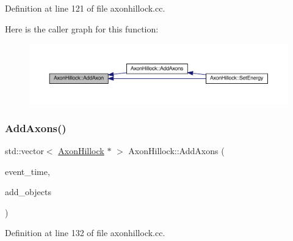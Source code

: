 Definition at line 121 of file axonhillock.\+cc.

Here is the caller graph for this function\+:\nopagebreak
\begin{figure}[H]
\begin{center}
\leavevmode
\includegraphics[width=350pt]{class_axon_hillock_a02bfbaea9ea7a160933f8500c8b41d6a_icgraph}
\end{center}
\end{figure}
\mbox{\label{class_axon_hillock_a54a82227b96757f1c0d7450df6a3df37}} 
\subsubsection{\texorpdfstring{Add\+Axons()}{AddAxons()}}
{\footnotesize\ttfamily std\+::vector$<$ \hyperlink{class_axon_hillock}{Axon\+Hillock} $\ast$ $>$ Axon\+Hillock\+::\+Add\+Axons (\begin{DoxyParamCaption}\item[{std\+::chrono\+::time\+\_\+point$<$ \hyperlink{universe_8h_a0ef8d951d1ca5ab3cfaf7ab4c7a6fd80}{Clock} $>$}]{event\+\_\+time,  }\item[{std\+::vector$<$ \hyperlink{class_axon_hillock}{Axon\+Hillock} $\ast$$>$}]{add\+\_\+objects }\end{DoxyParamCaption})}



Definition at line 132 of file axonhillock.\+cc.

